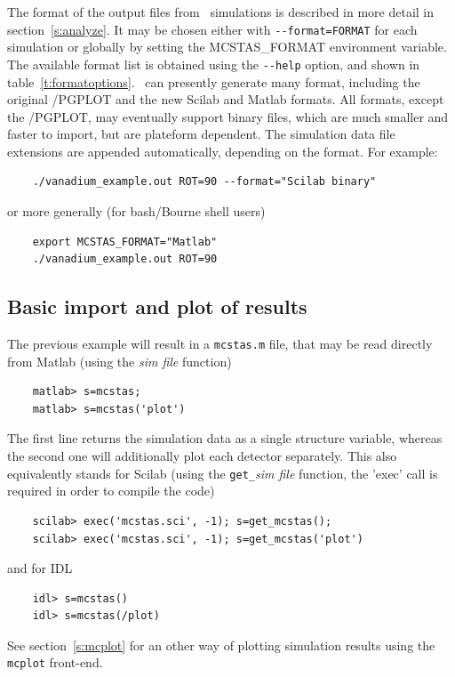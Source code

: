 The format of the output files from \MCS\ simulations is described in
more detail in section~\ref{s:analyze}. It may be chosen either with \verb+--format=FORMAT+ for each simulation or globally by setting the MCSTAS\_FORMAT environment variable. 
The available format list is obtained using the \verb+--help+ option, and shown in table~\ref{t:formatoptions}.
\MCS\ can presently generate many format, including the original \MCS /PGPLOT and the new Scilab and Matlab formats. All formats, except the \MCS /PGPLOT, may eventually support binary files, which are much smaller and faster to import, but are plateform dependent. The simulation data file extensions are appended automatically, depending on the format. For example:
\begin{verbatim}
    ./vanadium_example.out ROT=90 --format="Scilab binary"
\end{verbatim} 
or more generally (for bash/Bourne shell users)
\begin{verbatim}
    export MCSTAS_FORMAT="Matlab"
    ./vanadium_example.out ROT=90
\end{verbatim}

\subsection{Basic import and plot of results}

The previous example will result in a \verb+mcstas.m+ file, that may be read directly from Matlab (using the {\it sim file} function)
\begin{verbatim}
    matlab> s=mcstas;
    matlab> s=mcstas('plot')
\end{verbatim} 
The first line returns the simulation data as a single structure variable, whereas the second one will additionally plot each detector separately.
This also equivalently stands for Scilab (using the \verb+get_+{\it sim file} function, the 'exec' call is required in order to compile the code)
\begin{verbatim}
    scilab> exec('mcstas.sci', -1); s=get_mcstas();
    scilab> exec('mcstas.sci', -1); s=get_mcstas('plot')
\end{verbatim} 
and for IDL
\begin{verbatim}
    idl> s=mcstas()
    idl> s=mcstas(/plot)
\end{verbatim} 
See section~\ref{s:mcplot} for an other way of plotting simulation results using the \verb+mcplot+ front-end. 

